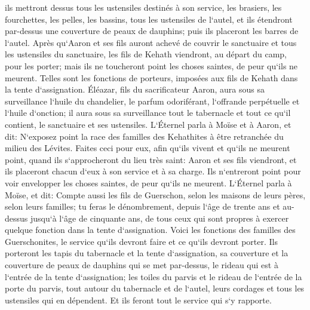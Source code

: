 \verse ils mettront dessus tous les ustensiles destinés à son service, les brasiers, les fourchettes, les pelles, les bassins, tous les ustensiles de l`autel, et ils étendront par-dessus une couverture de peaux de dauphins; puis ils placeront les barres de l`autel. 
\verse Après qu`Aaron et ses fils auront achevé de couvrir le sanctuaire et tous les ustensiles du sanctuaire, les fils de Kehath viendront, au départ du camp, pour les porter; mais ils ne toucheront point les choses saintes, de peur qu`ils ne meurent. Telles sont les fonctions de porteurs, imposées aux fils de Kehath dans la tente d`assignation. 
\verse Éléazar, fils du sacrificateur Aaron, aura sous sa surveillance l`huile du chandelier, le parfum odoriférant, l`offrande perpétuelle et l`huile d`onction; il aura sous sa surveillance tout le tabernacle et tout ce qu`il contient, le sanctuaire et ses ustensiles. 
\verse L`Éternel parla à Moïse et à Aaron, et dit: 
\verse N`exposez point la race des familles des Kehathites à être retranchée du milieu des Lévites. 
\verse Faites ceci pour eux, afin qu`ils vivent et qu`ils ne meurent point, quand ils s`approcheront du lieu très saint: Aaron et ses fils viendront, et ils placeront chacun d`eux à son service et à sa charge. 
\verse Ils n`entreront point pour voir envelopper les choses saintes, de peur qu`ils ne meurent. 
\verse L`Éternel parla à Moïse, et dit: 
\verse Compte aussi les fils de Guerschon, selon les maisons de leurs pères, selon leurs familles; 
\verse tu feras le dénombrement, depuis l`âge de trente ans et au-dessus jusqu`à l`âge de cinquante ans, de tous ceux qui sont propres à exercer quelque fonction dans la tente d`assignation. 
\verse Voici les fonctions des familles des Guerschonites, le service qu`ils devront faire et ce qu`ils devront porter. 
\verse Ils porteront les tapis du tabernacle et la tente d`assignation, sa couverture et la couverture de peaux de dauphins qui se met par-dessus, le rideau qui est à l`entrée de la tente d`assignation; 
\verse les toiles du parvis et le rideau de l`entrée de la porte du parvis, tout autour du tabernacle et de l`autel, leurs cordages et tous les ustensiles qui en dépendent. Et ils feront tout le service qui s`y rapporte. 
